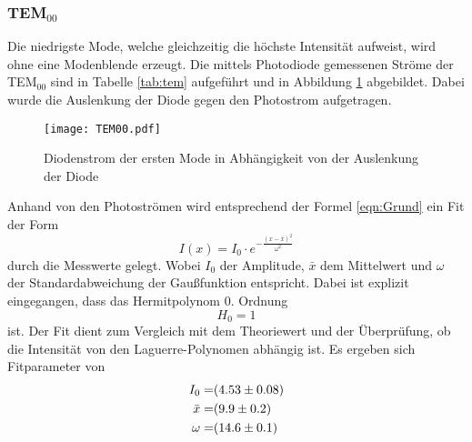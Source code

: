 \subsubsection{TEM$_\text{00}$}
Die niedrigste Mode, welche gleichzeitig die höchste Intensität aufweist, wird ohne eine Modenblende erzeugt. Die mittels Photodiode gemessenen Ströme der TEM$_{00}$ sind in Tabelle \ref{tab:tem} aufgeführt und in Abbildung \ref{fig:TEM00} abgebildet. Dabei wurde die Auslenkung der Diode gegen den Photostrom aufgetragen.
\begin{figure}
  \centering
  \texttt{[image: TEM00.pdf]}
  \caption{Diodenstrom der ersten Mode in Abhängigkeit von der Auslenkung der Diode}
  \label{fig:TEM00}
\end{figure}
Anhand von den Photoströmen wird entsprechend der Formel \ref{eqn:Grund} ein Fit der Form
\begin{equation}
  I(x) = I_0 \cdot e^{- \frac{(x-\bar{x})^2}{\omega^2} }
  \label{eqn:gausian}
\end{equation}
durch die Messwerte gelegt. Wobei $I_0$ der Amplitude, $\bar{x}$ dem Mittelwert und $\omega$ der Standardabweichung der Gaußfunktion entspricht. Dabei ist explizit eingegangen, dass das Hermitpolynom 0. Ordnung
\begin{equation}
  H_0 = 1
  \label{}
\end{equation}
ist. Der Fit dient zum Vergleich mit dem Theoriewert und der Überprüfung, ob die Intensität von den Laguerre-Polynomen abhängig ist. Es ergeben sich Fitparameter von
\begin{eqnarray}
  I_0 =& (\num{4.53 +- 0.08})	\\
  \bar{x} =& (\num{9.9 +- 0.2})	\\
  \omega =& (\num{14.6 +-0.1})
  \label{eqn:coef}
\end{eqnarray}
